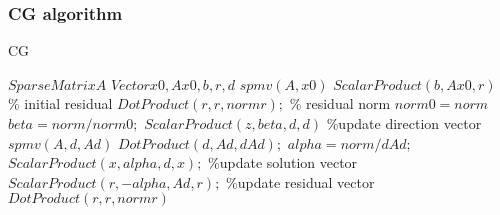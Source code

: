 \documentclass[mathserif]{beamer}
\begin{document}
\begin{frame}
\frametitle{CG algorithm}

\begin{block}{}
\begin{algorithm}[H]
\tiny
\caption{CG}
\begin{algorithmic}[0.5]

\State $SparseMatrix A$
\State $Vector x0, Ax0, b, r, d$ 
\State $spmv(A, x0)$ 
\State $ScalarProduct(b, Ax0, r)$ \% initial residual
\State $DotProduct(r, r, normr);$ \% residual norm
\State $norm0 = norm$ 
	\State $beta = norm/norm0;$
	\State $ScalarProduct(z, beta, d, d)$ \%update direction vector
	\State $spmv(A, d, Ad)$ 
	\State $DotProduct(d, Ad, dAd);$
	\State $alpha = norm/dAd;$
	\State $ScalarProduct(x, alpha, d, x);$ \%update solution vector
	\State $ScalarProduct(r, -alpha, Ad, r);$ \%update residual vector
	\State $DotProduct(r, r, normr)$
\EndFor
\end{algorithmic}
\end{algorithm}	

\end{block}
\end{frame}
\end{document}
